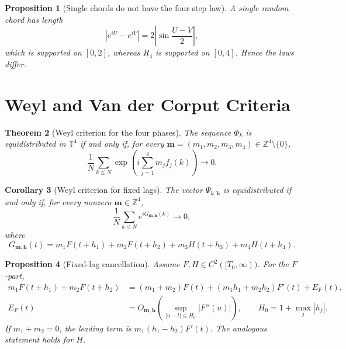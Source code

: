 \documentclass[11pt]{amsart}
\numberwithin{equation}{section}
\theoremstyle{plain}
\newtheorem{theorem}{Theorem}[section]
\newtheorem{proposition}[theorem]{Proposition}
\newtheorem{corollary}[theorem]{Corollary}
\theoremstyle{definition}
\theoremstyle{remark}
\begin{document}
\begin{proposition}[Single chords do not have the four-step law]
\label{prop:single_chord}
A single random chord has length
\begin{equation}
|e^{iU}-e^{iV}|=2\left|\sin\frac{U-V}{2}\right|,
\label{eq:single_chord_length}
\end{equation}
which is supported on \([0,2]\), whereas \(R_4\) is supported on \([0,4]\). Hence the laws differ.
\end{proposition}

\section{Weyl and Van der Corput Criteria}
\label{sec:weyl_vdc}

\begin{theorem}[Weyl criterion for the four phases]
\label{thm:weyl_four_phases}
The sequence \(\Phi_k\) is equidistributed in \(\mathbb T^4\) if and only if, for every \(\mathbf m=(m_1,m_2,m_3,m_4)\in\mathbb Z^4\setminus\{0\}\),
\begin{equation}
\frac1N\sum_{k\leq N}
\exp\left(i\sum_{j=1}^4m_jf_j(k)\right)\longrightarrow0.
\label{eq:weyl_criterion}
\end{equation}
\end{theorem}

\begin{corollary}[Weyl criterion for fixed lags]
\label{cor:weyl_fixed_lags}
The vector \(\Psi_{k,\mathbf h}\) is equidistributed if and only if, for every nonzero \(\mathbf m\in\mathbb Z^4\),
\begin{equation}
\frac1N\sum_{k\leq N}e^{iG_{\mathbf m,\mathbf h}(k)}\longrightarrow0,
\label{eq:lagged_weyl}
\end{equation}
where
\begin{equation}
G_{\mathbf m,\mathbf h}(t)
=m_1F(t+h_1)+m_2F(t+h_2)+m_3H(t+h_3)+m_4H(t+h_4).
\label{eq:Gmh}
\end{equation}
\end{corollary}

\begin{proposition}[Fixed-lag cancellation]
\label{prop:fixed_lag_cancellation}
Assume \(F,H\in C^2([T_0,\infty))\). For the \(F\)-part,
\begin{align}
m_1F(t+h_1)+m_2F(t+h_2)
&=(m_1+m_2)F(t)
 +(m_1h_1+m_2h_2)F'(t)+E_F(t),
\label{eq:fixed_lag_expansion}\\
E_F(t)
&=O_{\mathbf m,\mathbf h}\left(\sup_{|u-t|\leq H_0}|F''(u)|\right),
\qquad H_0=1+\max_j|h_j|.
\label{eq:fixed_lag_error}
\end{align}
If \(m_1+m_2=0\), the leading term is \(m_1(h_1-h_2)F'(t)\). The analogous statement holds for \(H\).
\end{proposition}
\end{document}
